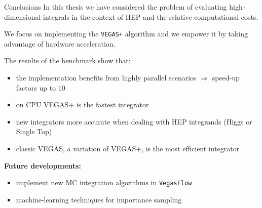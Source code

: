 \documentclass[t,handout,professionalfont,serif]{beamer}
\begin{document}
\begin{frame}{Conclusions}
	\scriptsize
	In this thesis we have considered the problem of evaluating high-dimensional integrals in the context of HEP and 
	the relative computational costs.
	
	We focus on implementing the \texttt{VEGAS+} algorithm and we empower it by taking advantage of hardware acceleration.
	
	The results of the benchmark show  that:
	
	\begin{itemize}
		\item the implementation benefits from highly parallel scenarios $\Rightarrow$ speed-up factors up to 10
		\item on CPU VEGAS+ is the fastest integrator
		\item new integrators more accurate when dealing with HEP integrands (Higgs or Single Top)
		\item classic VEGAS, a variation of VEGAS+, is the most efficient integrator
		
	\end{itemize}
\vspace{1cm}

\textbf{Future developments:}
\begin{itemize}
	\item implement new MC integration algorithms in \texttt{VegasFlow}
	\item machine-learning techniques for importance sampling
\end{itemize}
	
\end{frame}
\end{document}
